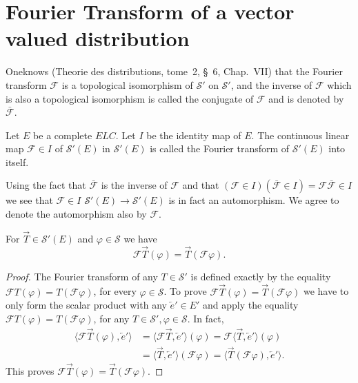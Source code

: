 
\chapter{Fourier Transform of a vector valued distribution}\label{chap8}


One\pageoriginale knows (Theorie des distributions, tome~2, \S~6, Chap.~VII) that
the Fourier transform $\mathscr{F}$ is a topological isomorphism of
$\mathscr{S}'$ on $\mathscr{S}'$, and the inverse of $\mathscr{F}$
which is also a topological isomorphism is called the conjugate of
$\mathscr{F}$ and is denoted by $\mathscr{\bar{F}}$.

\setcounter{section}{8}
\setcounter{definition}{0}
\begin{definition}\label{chap8:def8.1}
Let $E$ be a complete $E L C$. Let $I$ be the identity map of $E$. The
continuous linear map $\mathscr{F} \in I$ of $\mathscr{S}'
(E)$ in $\mathscr{S}' (E)$ is called the Fourier transform of
$\mathscr{S}'(E)$ into itself.

Using the fact that $\bar{\mathscr{F}}$ is the inverse of
$\mathscr{F}$ and that $(\mathscr{F} \in I)(\bar{\mathscr{F}}
\in I) = \mathscr{F} \bar{\mathscr{F}} \in I$ we see
that $\mathscr{F} \in I$ $\mathscr{S}'(E) \to \mathscr{S}'(E)$
is in fact an automorphism. We agree to denote the automorphism also
by $\mathscr{F}$.
\end{definition}

\setcounter{section}{8}
\setcounter{prop}{0}
\begin{prop}\label{chap8:prop8.1}
For $\overrightarrow{T} \in \mathscr{S}'(E)$ and $\varphi
\in \mathscr{S}$ we have
$$
\mathscr{F} \overrightarrow{T} (\varphi) = \overrightarrow{T}
(\mathscr{F} \varphi).
$$
\end{prop}
\begin{proof}
The Fourier transform of any $T \in \mathscr{S}'$ is defined
exactly by the equality $\mathscr{F} T (\varphi) = T (\mathscr{F}
\varphi)$, for every $\varphi \in \mathscr{S}$. To prove
$\mathscr{F} \overrightarrow{T} (\varphi)=\overrightarrow{T}
(\mathscr{F} \varphi)$ we have to only form the scalar product with
any $\overleftarrow{e}' \in E'$ and apply the equality
$\mathscr{F} T (\varphi) = T(\mathscr{F} \varphi)$, for any $T
\in \mathscr{S}', \varphi \in \mathscr{S}$. In fact,
\begin{align*}
\langle \mathscr{F} \overrightarrow{T} (\varphi),
\overleftarrow{e}'\rangle &= \langle \mathscr{F} \overrightarrow{T},
\overleftarrow{e}' \rangle (\varphi) = \mathscr{F} \langle
\overrightarrow{T}, \overleftarrow{e}'\rangle (\varphi)\\
&= \langle \overrightarrow{T}, \overleftarrow{e}' \rangle (\mathscr{F}
\varphi) = \langle \overrightarrow{T} (\mathscr{F} \varphi),
\overleftarrow{e}'\rangle.
\end{align*}
This proves $\mathscr{F} \overrightarrow{T} (\varphi) =
\overrightarrow{T} (\mathscr{F} \varphi)$.
\end{proof}

